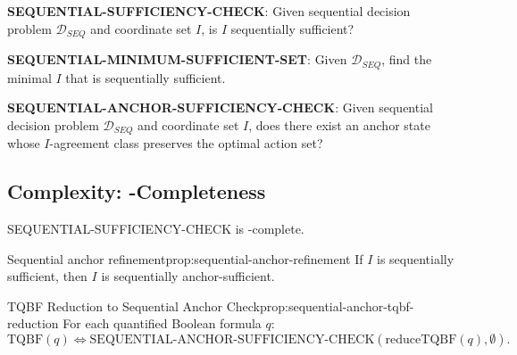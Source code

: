 \begin{decision}\label{dec:sequential-sufficiency-check}
\textbf{SEQUENTIAL-SUFFICIENCY-CHECK}: Given sequential decision problem $\mathcal{D}_{SEQ}$ and coordinate set $I$, is $I$ sequentially sufficient?
\end{decision}

\begin{decision}\label{dec:sequential-minsuff}
\textbf{SEQUENTIAL-MINIMUM-SUFFICIENT-SET}: Given $\mathcal{D}_{SEQ}$, find the minimal $I$ that is sequentially sufficient.
\end{decision}

\begin{decision}\label{dec:sequential-anchor-sufficiency-check}
\textbf{SEQUENTIAL-ANCHOR-SUFFICIENCY-CHECK}: Given sequential decision problem $\mathcal{D}_{SEQ}$ and coordinate set $I$, does there exist an anchor state whose $I$-agreement class preserves the optimal action set?
\end{decision}


\subsection{Complexity: \PSPACE-Completeness}

\begin{theorem}\label{th:sequential-sufficiency-pspace}
SEQUENTIAL-SUFFICIENCY-CHECK is \PSPACE-complete.
\end{theorem}

\begin{claim}{Sequential anchor refinement}{prop:sequential-anchor-refinement}
If $I$ is sequentially sufficient, then $I$ is sequentially anchor-sufficient.
\end{claim}


\begin{claim}{TQBF Reduction to Sequential Anchor Check}{prop:sequential-anchor-tqbf-reduction}
For each quantified Boolean formula $q$:
\[
\mathrm{TQBF}(q)
\iff
\mathrm{SEQUENTIAL\mbox{-}ANCHOR\mbox{-}SUFFICIENCY\mbox{-}CHECK}(\mathrm{reduceTQBF}(q),\emptyset).
\]
\end{claim}

